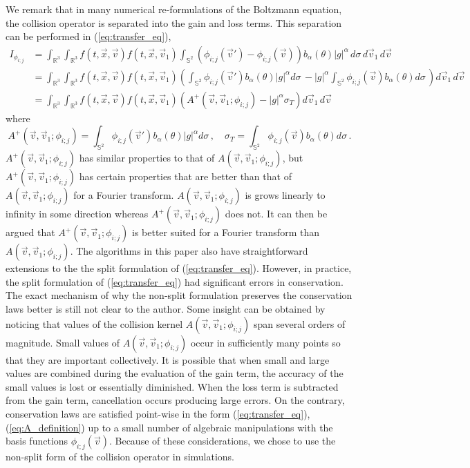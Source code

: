 \documentclass[12pt]{CSUNthesis}
\def\R{\mathbb{R}}
\def\R{\mathbb{R}}
\def\Sbb{\mathbb{S}}
\newcommand{\vecv}{\vec{v}}
\begin{document}
We remark that in many numerical re-formulations of the Boltzmann equation, the collision 
operator is separated into the gain and loss terms.
This separation can be performed in (\ref{eq:transfer_eq}),
\begin{align}
\label{eq:I_split}
I_{\phi_{i;j}}&= \int_{\R^3}\int_{\R^3} f(t,\vec{x},\vec{v}) f(t,\vec{x},\vec{v}_{1})
\int_{\Sbb^2}(\phi_{i;j}(\vec{v}')-\phi_{i;j}(\vec{v})) b_{\alpha}(\theta) |g|^\alpha \, d\sigma\,
 d\vec{v}_{1}\, d\vec{v} \nonumber \\
&= \int_{\R^3}\int_{\R^3} f(t,\vec{x},\vec{v}) f(t,\vec{x},\vec{v}_{1}) (\int_{\Sbb^2}\phi_{i;j}(\vec{v}')b_{\alpha}(\theta) |g|^\alpha d\sigma\, - |g|^\alpha\int_{\Sbb^2}\phi_{i;j}(\vec{v})b_{\alpha}(\theta)  d\sigma\,)  d\vec{v}_{1}\, d\vec{v} \nonumber \\
&= \int_{\R^3}\int_{\R^3} f(t,\vec{x},\vec{v}) f(t,\vec{x},\vec{v}_{1}) (A^+(\vecv,\vecv_1;\phi_{i;j}) - |g|^\alpha \sigma_T)  d\vec{v}_{1}\, d\vec{v}
\end{align}
where
\begin{equation}
\label{eq:A_split}
A^+(\vecv,\vecv_1;\phi_{i;j}) = \int_{\Sbb^2}\phi_{i;j}(\vec{v}')b_{\alpha}(\theta) |g|^\alpha d\sigma\, , \quad \sigma_T = \int_{\Sbb^2}\phi_{i;j}(\vec{v})b_{\alpha}(\theta)  d\sigma\, .
\end{equation}
$A^+(\vecv,\vecv_1;\phi_{i;j})$ has similar properties to that of $A(\vecv,\vecv_1;\phi_{i;j})$, but
$A^+(\vecv,\vecv_1;\phi_{i;j})$ has certain properties that are better than that of $A(\vecv,\vecv_1;\phi_{i;j})$ for a Fourier transform. 
$A(\vecv,\vecv_1;\phi_{i;j})$ is grows linearly to infinity in some direction whereas $A^+(\vecv,\vecv_1;\phi_{i;j})$ does not. It can then be argued that $A^+(\vecv,\vecv_1;\phi_{i;j})$ is better suited for a Fourier transform than $A(\vecv,\vecv_1;\phi_{i;j})$. The algorithms in this paper also have straightforward extensions to the the split formulation of (\ref{eq:transfer_eq}). However, in practice, the split formulation of (\ref{eq:transfer_eq}) had significant errors in conservation.
The exact mechanism of why the non-split formulation preserves the conservation 
laws better is still not clear to the author. Some insight 
can be obtained by noticing that values of the 
collision kernel  $A(\vec{v},\vec{v}_{1};\phi_{i;j})$ span several orders of magnitude.
Small values of $A(\vec{v},\vec{v}_{1};\phi_{i;j})$ occur in
sufficiently many points so that they are important collectively. It is possible that 
when small and large values are combined during the evaluation of the gain term, the 
accuracy of the small values is lost or essentially diminished. When the loss term is subtracted from the 
gain term, cancellation occurs producing large errors. On the contrary, 
conservation 
laws are satisfied point-wise in the form (\ref{eq:transfer_eq}), 
(\ref{eq:A_definition}) up to a small number of algebraic manipulations with the basis functions 
$\phi_{i;j}(\vec{v})$. Because of these considerations, we chose to 
use the non-split form of the collision operator in simulations. 
\end{document}
